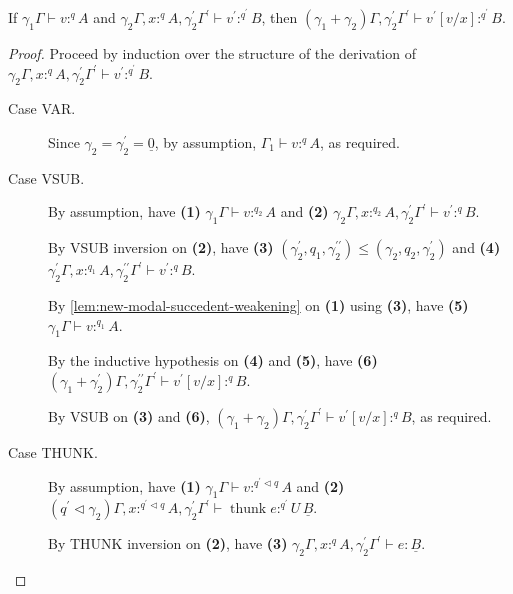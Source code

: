 \documentclass[acmsmall,screen,nonacm]{acmart}
\DeclareMathOperator{\thunk}{\text{thunk}}
\newcommand{\tee}{\vdash}
\DeclareMathOperator{\scale}{\mathbin{\triangleleft}}
\begin{document}
\begin{lemma}
\label{lem:new-modal-forward-substitution-vals}
  If $\gamma_1\Gamma \tee v :^q A$ and $\gamma_2\Gamma, x :^q A, \gamma_2^\prime\Gamma^\prime \tee v^\prime :^{q^\prime} B$, then $(\gamma_1 + \gamma_2)\Gamma, \gamma_2^\prime\Gamma^\prime \tee v^\prime[v/x] :^{q^\prime} B$.
\end{lemma}

\begin{proof}
  Proceed by induction over the structure of the derivation of $\gamma_2\Gamma, x :^q A, \gamma_2^\prime\Gamma^\prime \tee v^\prime :^{q^\prime} B$.

  \begin{description}
    \item[Case VAR.]
    Since $\gamma_2 = \gamma_2^\prime = \underline{0}$, by assumption, $\Gamma_1 \tee v :^q A$, as required.
    \\
    \item[Case VSUB.]
    By assumption, have \textbf{(1)} $\gamma_1\Gamma \tee v :^{q_2} A$ and \textbf{(2)} $\gamma_2\Gamma, x :^{q_2} A, \gamma_2^\prime\Gamma^\prime \tee v^\prime :^q B$.

    By VSUB inversion on \textbf{(2)}, have \textbf{(3)} $(\gamma_2^\prime, q_1, \gamma_2^{\prime\prime}) \le (\gamma_2, q_2, \gamma_2^\prime)$ and \textbf{(4)} $\gamma_2^\prime\Gamma, x :^{q_1} A, \gamma_2^{\prime\prime}\Gamma^\prime \tee v^\prime :^q B$.

    By \ref{lem:new-modal-succedent-weakening} on \textbf{(1)} using \textbf{(3)}, have \textbf{(5)} $\gamma_1\Gamma \tee v :^{q_1} A$.

    By the inductive hypothesis on \textbf{(4)} and \textbf{(5)}, have \textbf{(6)} $(\gamma_1 + \gamma_2^\prime)\Gamma, \gamma_2^{\prime\prime}\Gamma^\prime \tee v^\prime[v/x] :^q B$.

    By VSUB on \textbf{(3)} and \textbf{(6)}, $(\gamma_1 + \gamma_2)\Gamma, \gamma_2^\prime\Gamma^\prime \tee v^\prime[v/x] :^q B$, as required.
    \\
    \item[Case THUNK.]
    By assumption, have \textbf{(1)} $\gamma_1\Gamma \tee v :^{q^\prime \scale q} A$ and \textbf{(2)} $(q^\prime \scale \gamma_2)\Gamma, x :^{q^\prime \scale q} A, \gamma_2^\prime\Gamma^\prime \tee \thunk e :^{q^\prime} U \, \underline{B}$.

    By THUNK inversion on \textbf{(2)}, have \textbf{(3)} $\gamma_2\Gamma, x :^q A, \gamma_2^\prime\Gamma^\prime \tee e : \underline{B}$.


\end{description}
\end{proof}
\end{document}
